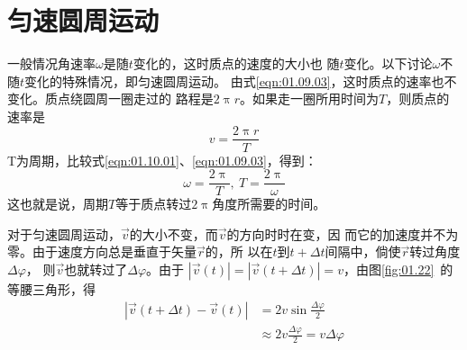 \section{匀速圆周运动}\label{sec:01.10}

    一般情况角速率$\omega$是随$t$变化的，这时质点的速度的大小也
随$t$变化。以下讨论$\omega$不随$t$变化的特殊情况，即匀速圆周运动。
由式\eqref{eqn:01.09.03}，这时质点的速率也不变化。质点绕圆周一圈走过的
路程是$2\uppi r$。如果走一圈所用时间为$T$，则质点的速率是
\begin{equation}\label{eqn:01.10.01}
    v=\frac{2 \uppi r}{T}
\end{equation}
T为周期，比较式\eqref{eqn:01.10.01}、\eqref{eqn:01.09.03}，得到：
\begin{equation}\label{eqn:01.10.02}
    \omega=\frac{2 \uppi}{T}, ~ T=\frac{2 \uppi}{\omega}
\end{equation}
这也就是说，周期$T$等于质点转过$2\uppi$角度所需要的时间。

    对于匀速圆周运动，$\vec{v}$的大小不变，而$\vec{v}$的方向时时在变，因
而它的加速度并不为零。由于速度方向总是垂直于矢量$\vec{r}$的，所
以在$t$到$t+\Delta t$间隔中，倘使$\vec{r}$转过角度$\Delta\varphi$，
则$\vec{v}$也就转过了$\Delta\varphi$。由于
$|\vec{v}\left(t\right)|=|\vec{v}\left(t+\Delta t\right)|=v$，由图\ref{fig:01.22}~的等腰三角形，得
\begin{equation*}
    \begin{aligned}
        |\vec{v}\left(t+\Delta t\right)-\vec{v}\left(t\right)| &=2 v \sin \frac{\Delta \varphi}{2} \\
        & \approx 2 v\frac{\Delta \varphi}{2}=v \Delta \varphi
    \end{aligned}
\end{equation*}

